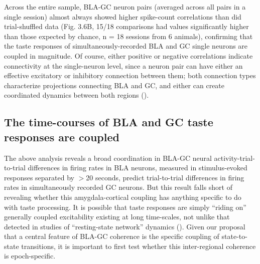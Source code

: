\begin{refsection}
Across the entire sample, BLA-GC neuron pairs (averaged across all pairs in a single session) almost always showed higher spike-count correlations than did trial-shuffled data (Fig. 3.6B, 15/18 comparisons had values significantly higher than those expected by chance, n = 18 sessions from 6 animals), confirming that the taste responses of simultaneously-recorded BLA and GC single neurons are coupled in magnitude. Of course, either positive or negative correlations indicate connectivity at the single-neuron level, since a neuron pair can have either an effective excitatory or inhibitory connection between them; both connection types characterize projections connecting BLA and GC, and either can create coordinated dynamics between both regions (\cite{haley2016a,fu2020a}).

\subsection{The time-courses of BLA and GC taste responses are coupled}
The above analysis reveals a broad coordination in BLA-GC neural activity-trial-to-trial differences in firing rates in BLA neurons, measured in stimulus-evoked responses separated by \(>\)20 seconds, predict trial-to-trial differences in firing rates in simultaneously recorded GC neurons. But this result falls short of revealing whether this amygdala-cortical coupling has anything specific to do with taste processing. It is possible that taste responses are simply “riding on” generally coupled excitability existing at long time-scales, not unlike that detected in studies of “resting-state network” dynamics (\cite{raichle2015a,seitzman2019a}). Given our proposal that a central feature of BLA-GC coherence is the specific coupling of state-to-state transitions, it is important to first test whether this inter-regional coherence is epoch-specific.


\end{refsection}
